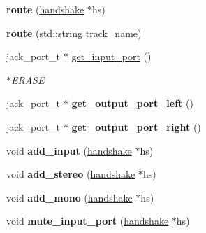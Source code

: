 \begin{DoxyCompactItemize}
\item 
\mbox{\label{classroute_a3de24b4c9f71cd486d46fb6c39a6778d}} 
{\bfseries route} (\mbox{\hyperlink{classhandshake}{handshake}} $\ast$hs)
\item 
\mbox{\label{classroute_a1b95fb2ceb9751062f3e1d28cbd485b2}} 
{\bfseries route} (std\+::string track\+\_\+name)
\item 
\mbox{\label{classroute_ab5d810362212e62f86599b1d80869d43}} 
jack\+\_\+port\+\_\+t $\ast$ \mbox{\hyperlink{classroute_ab5d810362212e62f86599b1d80869d43}{get\+\_\+input\+\_\+port}} ()
\begin{DoxyCompactList}\small\item\em $\ast$\+E\+R\+A\+SE \end{DoxyCompactList}\item 
\mbox{\label{classroute_a538c5077d4ff9531a4e905058f278707}} 
jack\+\_\+port\+\_\+t $\ast$ {\bfseries get\+\_\+output\+\_\+port\+\_\+left} ()
\item 
\mbox{\label{classroute_a2115b3e03c972f9b8f13cbe91fe0d3bc}} 
jack\+\_\+port\+\_\+t $\ast$ {\bfseries get\+\_\+output\+\_\+port\+\_\+right} ()
\item 
\mbox{\label{classroute_a61f72ad6ee6c070cc207e009f36742a7}} 
void {\bfseries add\+\_\+input} (\mbox{\hyperlink{classhandshake}{handshake}} $\ast$hs)
\item 
\mbox{\label{classroute_a66155aecc5f4cb56ff0f365e9c9574d6}} 
void {\bfseries add\+\_\+stereo} (\mbox{\hyperlink{classhandshake}{handshake}} $\ast$hs)
\item 
\mbox{\label{classroute_a5ea3de9bc26a7b68a9236287e24ce5f1}} 
void {\bfseries add\+\_\+mono} (\mbox{\hyperlink{classhandshake}{handshake}} $\ast$hs)
\item 
\mbox{\label{classroute_a72c9ffccca230d286f6e5207dc6b2600}} 
void {\bfseries mute\+\_\+input\+\_\+port} (\mbox{\hyperlink{classhandshake}{handshake}} $\ast$hs)
\item 
\mbox{\label{classroute_ac0fa1845cd1c6870e97043c8e1673daa}} 

\end{DoxyCompactItemize}
